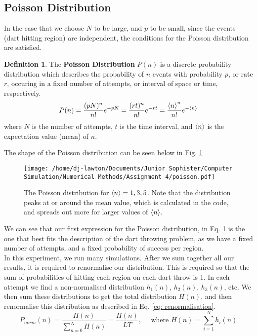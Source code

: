 \documentclass{article}
\theoremstyle{definition}
\newtheorem{definition}{Definition}[section]
\theoremstyle{remark}
\begin{document}
\subsection{Poisson Distribution}
In the case that we choose $N$ to be large, and $p$ to be small, since the events (dart hitting region) are independent, the conditions for the Poisson distribution are satisfied.
\begin{definition}
    The \textbf{Poisson Distribution} $P(n)$ is a discrete probability distribution which describes the probability of $n$ events with probability $p$, or rate $r$, occuring in a fixed number of attempts, or interval of space or time, respectively.
    \begin{equation}
        \label{eq: poisson}
        P(n) = \frac{(pN)^n}{n!}e^{-pN} = \frac{(rt)^n}{n!} e^{-rt} = \frac{\braket{n}^n }{n!}e^{-\braket{n}}
    \end{equation}
    where $N$ is the number of attempts, $t$ is the time interval, and $\braket{n}$ is the expectation value (mean) of $n$.
\end{definition}
The shape of the Poisson distribution can be seen below in Fig. \ref{fig: poisson}
\begin{figure}[H]
    \centering
    \texttt{[image: /home/dj-lawton/Documents/Junior Sophister/Computer Simulation/Numerical Methods/Assignment 4/poisson.pdf]}
    \caption{\label{fig: poisson} The Poisson distribution for $\braket{n}=1, 3, 5$. Note that the distribution peaks at or around the mean value, which is calculated in the code, and spreads out more for larger values of $\braket{n}$.}
\end{figure}
We can see that our first expression for the Poisson distribution, in Eq. \ref{fig: poisson} is the one that best fits the description of the dart throwing problem, as we have a fixed number of attempts, and a fixed probability of success per region.\\
\indent In this experiment, we run many simulations. After we sum together all our results, it is required to renormalise our distribution. This is required so that the sum of probabilities of hitting each region on each dart throw is 1. In each attempt we find a non-normalised distribution $h_1(n)$, $h_2(n)$, $h_3(n)$, etc. We then sum these distributions to get the total distribution $H(n)$, and then renormalise this distribution as described in Eq. \ref{eq: renormalisation}.
\begin{equation}
    \label{eq: renormalisation}
    P_{norm}(n) = \frac{H(n)}{\sum_{n=0}^{N}H(n)} = \frac{H(n)}{LT}, \quad \text{ where } H(n) = \sum_{i=1}^{N}h_i(n)
\end{equation}
\end{document}
